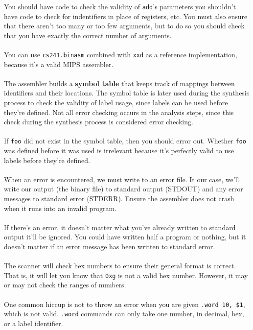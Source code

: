 \documentclass[]{article}
\theoremstyle{definition}
\begin{document}
				You should have code to check the validity of \verb+add+'s parameters \textendash{} you shouldn't have code to check for indentifiers in place of registers, etc. You must also ensure that there aren't too many or too few arguments, but to do so you should check that you have exactly the correct number of arguments.
				\\ \\
				You can use \verb+cs241.binasm+ combined with \verb+xxd+ as a reference implementation, because it's a valid MIPS assembler.
				\\ \\
				The assembler builds a \textbf{symbol table} that keeps track of mappings between identifiers and their locations. The symbol table is later used during the synthesis process to check the validity of label usage, since labels can be used before they're defined. Not all error checking occurs in the analysis steps, since this check during the synthesis process is considered error checking.
				\\ \\
				If \verb+foo+ did not exist in the symbol table, then you should error out. Whether \verb+foo+ was defined before it was used is irrelevant because it's perfectly valid to use labels before they're defined.
				\\ \\
				When an error is encountered, we must write to an error file. It our case, we'll write our output (the binary file) to standard output (STDOUT) and any error messages to standard error (STDERR). Ensure the assembler does not crash when it runs into an invalid program.
				\\ \\
				If there's an error, it doesn't matter what you've already written to standard output \textendash{} it'll be ignored. You could have written half a program or nothing, but it doesn't matter if an error message has been written to standard error.
				\\ \\
				The scanner will check hex numbers to ensure their general format is correct. That is, it will let you know that \verb+0xg+ is not a valid hex number. However, it may or may not check the ranges of numbers.
				\\ \\
				One common hiccup is not to throw an error when you are given \verb+.word 10, $1+, which is not valid. \verb+.word+ commands can only take one number, in decimal, hex, or a label identifier.
\end{document}
